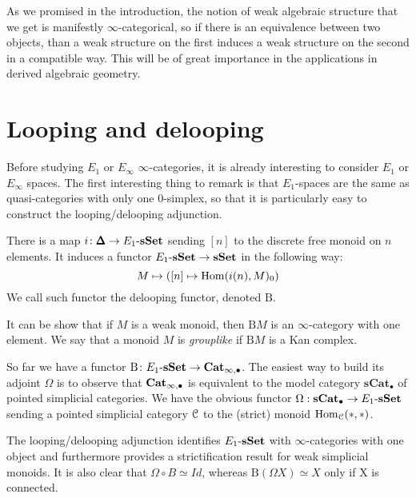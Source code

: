 \begin{refsection}
\begin{remark}
As we promised in the introduction, the notion of weak algebraic structure that we get is manifestly $\infty$-categorical, so if there is an equivalence between two objects, than a weak structure on the first induces a weak structure on the second in a compatible way. This will be of great importance in the applications in derived algebraic geometry.
\end{remark}

\section{Looping and delooping}

Before studying $E_1$ or $E_{\infty}$ $\infty$-categories, it is already interesting to consider $E_1$ or $E_{\infty}$ spaces. The first interesting thing to remark is that $E_1$-spaces are the same as quasi-categories with only one 0-simplex, so that it is particularly easy to construct the looping/delooping adjunction.

\begin{definition}
There is a map $i \colon \pmb{\Delta}\to E_1 \textrm{-} \mathbf{s\,\!\mathbf{Set}}$ sending $[n]$ to the discrete free monoid on $n$ elements. It induces a functor $E_1 \textrm{-} \mathbf{s\,\!\mathbf{Set}} \to \mathbf{s\,\!\mathbf{Set}}$ in the following way:
\[
M \mapsto ([n] \mapsto \mathrm{Hom}(i(n),M)_0 )
\]
We call such functor the delooping functor, denoted $\mathrm{B}$.
\end{definition}

\begin{proposition}
It can be show that if $M$ is a weak monoid, then $\mathrm{B}M$ is an $\infty$-category with one element. We say that a monoid $M$ is \emph{grouplike} if $\mathrm{B}M$ is a Kan complex.
\end{proposition}

\begin{remark}
So far we have a functor $\mathrm{B} \colon E_1 \textrm{-} \mathbf{s\,\!\mathbf{Set}} \to \mathbf{Cat}_{\infty,\bullet}$. The easiest way to build its adjoint $\Omega$ is to observe that $\mathbf{Cat}_{\infty, \bullet}$ is equivalent to the model category $\mathbf{sCat}_{\bullet}$ of pointed simplicial categories. We have the obvious functor $\Omega: \mathbf{sCat}_{\bullet} \to E_1\textrm{-} \mathbf{s\,\!\mathbf{Set}}$ sending a
pointed simplicial category $\mathcal{C}$ to the (strict) monoid $\mathrm{Hom}_{\mathcal{C}}(*,*)$.
\end{remark}

The looping/delooping adjunction identifies $E_1 \textrm{-} \mathbf{s\,\!\mathbf{Set}}$ with $\infty$-categories with one object and furthermore provides a strictification result for weak simplicial monoids. It is also clear that $\Omega \circ B \simeq Id$, whereas $\mathrm{B}(\Omega X) \simeq X$ only if X is connected.


\end{refsection}
